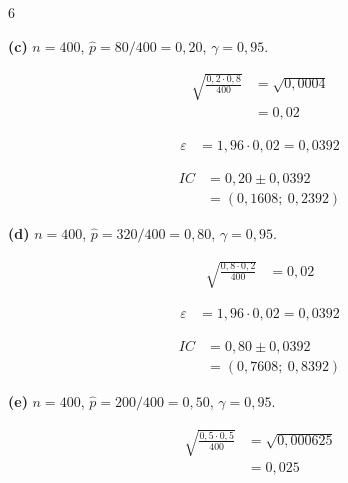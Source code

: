 \documentclass[8pt, a4paper, landscape]{extarticle}
\begin{document}
\begin{multicols}{6}
\vspace{0.2cm}

\textbf{(c)} $n = 400$, $\hat{p} = 80/400 = 0,20$, $\gamma = 0,95$.

\begin{equation*}
\begin{split}
\sqrt{\frac{0,2 \cdot 0,8}{400}} &= \sqrt{0,0004} \\
&= 0,02
\end{split}
\end{equation*}

\begin{equation*}
\begin{split}
\varepsilon &= 1,96 \cdot 0,02 = 0,0392
\end{split}
\end{equation*}

\begin{equation*}
\begin{split}
IC &= 0,20 \pm 0,0392 \\
&= (0,1608;\ 0,2392)
\end{split}
\end{equation*}

\vspace{0.2cm}

\textbf{(d)} $n = 400$, $\hat{p} = 320/400 = 0,80$, $\gamma = 0,95$.

\begin{equation*}
\begin{split}
\sqrt{\frac{0,8 \cdot 0,2}{400}} &= 0,02
\end{split}
\end{equation*}

\begin{equation*}
\begin{split}
\varepsilon &= 1,96 \cdot 0,02 = 0,0392
\end{split}
\end{equation*}

\begin{equation*}
\begin{split}
IC &= 0,80 \pm 0,0392 \\
&= (0,7608;\ 0,8392)
\end{split}
\end{equation*}

\vspace{0.2cm}

\textbf{(e)} $n = 400$, $\hat{p} = 200/400 = 0,50$, $\gamma = 0,95$.

\begin{equation*}
\begin{split}
\sqrt{\frac{0,5 \cdot 0,5}{400}} &= \sqrt{0,000625} \\
&= 0,025
\end{split}
\end{equation*}


\end{multicols}
\end{document}
